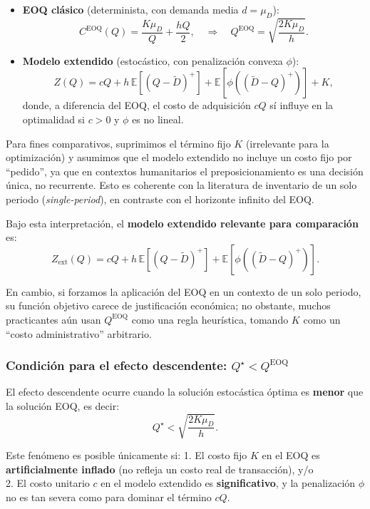 \documentclass[
  spanish,
  us-letterpaper,
  DIV=11,
  numbers=noendperiod]{scrreprt}
\numberwithin{equation}{section}
\begin{document}
\begin{itemize}
\item
  \textbf{EOQ clásico} (determinista, con demanda media \(d = \mu_D\)):
  \[
  C^{\text{EOQ}}(Q) = \frac{K \mu_D}{Q} + \frac{h Q}{2},
  \quad \Rightarrow \quad
  Q^{\text{EOQ}} = \sqrt{\frac{2 K \mu_D}{h}}.
  \]
\item
  \textbf{Modelo extendido} (estocástico, con penalización convexa
  \(\phi\)): \[
  Z(Q) = c Q + h \, \mathbb{E}[(Q - \tilde{D})^+] + \mathbb{E}[\phi((\tilde{D} - Q)^+)] + K,
  \] donde, a diferencia del EOQ, el costo de adquisición \(c Q\) sí
  influye en la optimalidad si \(c > 0\) y \(\phi\) es no lineal.
\end{itemize}

Para fines comparativos, suprimimos el término fijo \(K\) (irrelevante
para la optimización) y asumimos que el modelo extendido no incluye un
costo fijo por ``pedido'', ya que en contextos humanitarios el
preposicionamiento es una decisión única, no recurrente. Esto es
coherente con la literatura de inventario de un solo periodo
(\emph{single-period}), en contraste con el horizonte infinito del EOQ.

Bajo esta interpretación, el \textbf{modelo extendido relevante para
comparación} es: \[
Z_{\text{ext}}(Q) = c Q + h \, \mathbb{E}[(Q - \tilde{D})^+] + \mathbb{E}[\phi((\tilde{D} - Q)^+)].
\]

En cambio, si forzamos la aplicación del EOQ en un contexto de un solo
periodo, su función objetivo carece de justificación económica; no
obstante, muchos practicantes aún usan \(Q^{\text{EOQ}}\) como una regla
heurística, tomando \(K\) como un ``costo administrativo'' arbitrario.

\subsubsection{\texorpdfstring{Condición para el efecto descendente:
\(Q^\star < Q^{\text{EOQ}}\)}{Condición para el efecto descendente: Q\^{}\textbackslash star \textless{} Q\^{}\{\textbackslash text\{EOQ\}\}}}\label{condiciuxf3n-para-el-efecto-descendente-qstar-qtexteoq}

El efecto descendente ocurre cuando la solución estocástica óptima es
\textbf{menor} que la solución EOQ, es decir: \[
Q^\star < \sqrt{\frac{2 K \mu_D}{h}}.
\]

Este fenómeno es posible únicamente si: 1. El costo fijo \(K\) en el EOQ
es \textbf{artificialmente inflado} (no refleja un costo real de
transacción), y/o\\
2. El costo unitario \(c\) en el modelo extendido es
\textbf{significativo}, y la penalización \(\phi\) no es tan severa como
para dominar el término \(c Q\).
\end{document}
